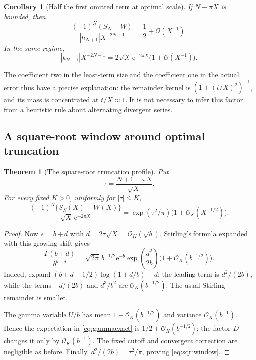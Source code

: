 \documentclass[11pt,a4paper]{article}
\newtheorem{theorem}{Theorem}[section]
\newtheorem{corollary}[corollary]{Corollary}
\theoremstyle{definition}
\numberwithin{equation}{section}
\newcommand{\ee}{\mathrm{e}}
\newcommand{\Oh}{\mathcal O}
\begin{document}
\begin{corollary}[Half the first omitted term at optimal scale]
\label{cor:half}
If $N-\pi X$ is bounded, then
\begin{equation}
 \frac{(-1)^N(S_N-W)}{|h_{N+1}|X^{-2N-1}}
                  =\frac12+\Oh(X^{-1}).
 \label{eq:half}
\end{equation}
In the same regime,
\begin{equation}
 |h_{N+1}|X^{-2N-1}
             =2\sqrt X\,\ee^{-2\pi X}\bigl(1+\Oh(X^{-1})\bigr).
 \label{eq:leastterm}
\end{equation}
\end{corollary}
The coefficient two in the least-term size and the coefficient one in the
actual error thus have a precise explanation: the remainder kernel is
$(1+(t/X)^2)^{-1}$, and its mass is concentrated at $t/X\approx1$.
It is not necessary to infer this factor from a heuristic rule about
alternating divergent series.

\subsection{A square-root window around optimal truncation}
\begin{theorem}[The square-root truncation profile]
\label{thm:sqrt}
Put
\begin{equation}
 \tau=\frac{N+1-\pi X}{\sqrt X}.
 \label{eq:tau}
\end{equation}
For every fixed $K>0$, uniformly for $|\tau|\le K$,
\begin{equation}
 \frac{(-1)^N\{S_N(X)-W(X)\}}
      {\sqrt X\,\ee^{-2\pi X}}
     =\exp(\tau^2/\pi)\bigl(1+\Oh_K(X^{-1/2})\bigr).
 \label{eq:sqrtwindow}
\end{equation}
\end{theorem}
\begin{proof}
Now $s=b+d$ with $d=2\tau\sqrt X=\Oh_K(\sqrt b)$.
Stirling's formula expanded with this growing shift gives
\begin{equation}
 \frac{\Gamma(b+d)}{b^{b+d}}
 =\sqrt{2\pi}\,b^{-1/2}\ee^{-b}
   \exp\left(\frac{d^2}{2b}\right)
              \bigl(1+\Oh_K(b^{-1/2})\bigr).
 \label{eq:moderate-stirling}
\end{equation}
Indeed, expand $(b+d-1/2)\log(1+d/b)-d$; the leading term is
$d^2/(2b)$, while the terms $-d/(2b)$ and $d^3/b^2$ are
$\Oh_K(b^{-1/2})$. The usual Stirling remainder is smaller.

The gamma variable $U/b$ has mean $1+\Oh_K(b^{-1/2})$ and variance
$\Oh_K(b^{-1})$. Hence the expectation in \eqref{eq:gammaexact} is
$1/2+\Oh_K(b^{-1/2})$; the factor $D$ changes it only by
$\Oh_K(b^{-1})$. The fixed cutoff and convergent correction are
negligible as before. Finally, $d^2/(2b)=\tau^2/\pi$, proving
\eqref{eq:sqrtwindow}.
\end{proof}
\end{document}
